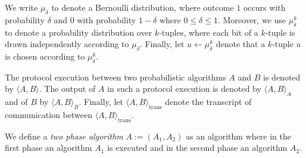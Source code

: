 %
%
\noindent
We write $\mu_{\delta}$ to denote a Bernoulli distribution, where outcome $1$ occurs with
probability $\delta$ and $0$ with probability $1-\delta$ where $0 \leq \delta \leq 1$.
Moreover, we use $\mu_{\delta}^k$ to denote a probability distribution over $k$-tuples,
where each bit of a $k$-tuple is drawn independently according to $\mu_{\delta}$.
Finally, let $u \leftarrow \mu_{\delta}^k$ denote that a $k$-tuple $u$ is chosen according to $\mu_{\delta}^k$.

The protocol execution between two probabilistic algorithms $A$ and $B$ is denoted by $\langle A, B \rangle$.
The output of $A$ in such a protocol execution is denoted by $\langle A, B \rangle_A$ and of $B$ by $\langle A, B \rangle_B$.
Finally, let $\langle A, B \rangle_{\text{trans}}$ denote the transcript of communication between $\langle A, B \rangle_{\text{trans}}$.

We define a \textit{two phase algorithm} $A := (A_1, A_2)$ as an algorithm where in the first phase an algorithm $A_1$
is executed and in the second phase an algorithm $A_2$.

